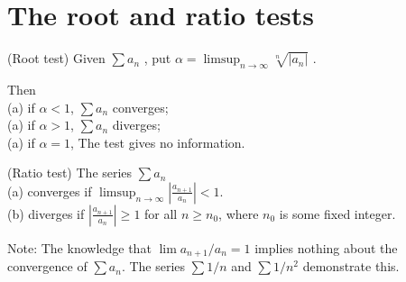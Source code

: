 \section{The root and ratio tests}

\begin{thm}(Root test)
    \label{thm:3.33 root test}
    Given $\sum a_n$ , put $\alpha = \limsup_{n \rightarrow \infty} \sqrt[n]{|a_n|} $ .

    Then \\
    (a) if $\alpha < 1$, $\sum a_n$ converges; \\
    (a) if $\alpha > 1$, $\sum a_n$ diverges; \\
    (a) if $\alpha = 1$, The test gives no information.
\end{thm}


\begin{thm}(Ratio test)
    \label{thm:3.34 ratio test}
    The series $\sum a_n$ \\
    (a) converges if $\limsup_{n \to \infty} \left|\frac{a_{n+1}}{a_n}\right| < 1$. \\
    (b) diverges if $\left|\frac{a_{n+1}}{a_n}\right| \geq 1$ for all $n \geq n_0$, where $n_0$ is some fixed integer.
\end{thm}


Note: The knowledge that $\lim a_{n+1}/a_n = 1$ implies nothing about the convergence of $\sum a_n$.
The series $\sum 1/n$ and $\sum 1/n^2$ demonstrate this.

